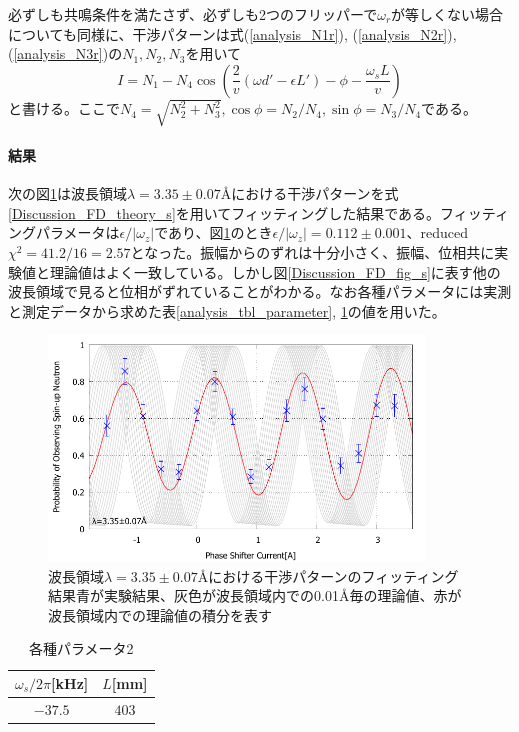 必ずしも共鳴条件を満たさず、必ずしも2つのフリッパーで$\omega_r$が等しくない場合についても同様に、干渉パターンは式(\ref{analysis_N1r}), (\ref{analysis_N2r}), (\ref{analysis_N3r})の$N_1, N_2, N_3$を用いて
\begin{equation}
I=N_1-N_4\cos\left(\frac{2}{v} (\omega d' -\epsilon L') -\phi -\frac{\omega_s L}{v} \right)\label{Discussion_FD_theory_s}
\end{equation}
と書ける。ここで$N_4=\sqrt{N_2^2+N_3^2}, \cos\phi=N_2/N_4, \sin\phi=N_3/N_4$である。

\paragraph{結果}
次の図\ref{Discussion_FD_fig_s_470}は波長領域$\lambda=3.35\pm0.07$\AA における干渉パターンを式\ref{Discussion_FD_theory_s}を用いてフィッティングした結果である。フィッティングパラメータは$\epsilon/|\omega_z|$であり、図\ref{Discussion_FD_fig_s_470}のとき$\epsilon/|\omega_z|=0.112\pm0.001$、reduced$\chi^2=41.2/16=2.57$となった。振幅からのずれは十分小さく、振幅、位相共に実験値と理論値はよく一致している。しかし図\ref{Discussion_FD_fig_s}に表す他の波長領域で見ると位相がずれていることがわかる。なお各種パラメータには実測と測定データから求めた表\ref{analysis_tbl_parameter}, \ref{Discussion_FD_tbl_parameter}の値を用いた。
\begin{figure}[h]
\centering
\includegraphics[width=10cm]{discussion/FD/IT_s_470.pdf}
\caption{波長領域$\lambda=3.35\pm0.07$\AA における干渉パターンのフィッティング結果\newline 青が実験結果、灰色が波長領域内での0.01\AA 毎の理論値、赤が波長領域内での理論値の積分を表す}\label{Discussion_FD_fig_s_470}
\end{figure}

\begin{table}[h]
\centering
\caption{各種パラメータ2}\label{Discussion_FD_tbl_parameter}
\begin{tabular}{cc}
$\omega_s/2\pi$[kHz]&$L$[mm]\\ \hline
$-37.5$&$403$
\end{tabular}
\end{table}

